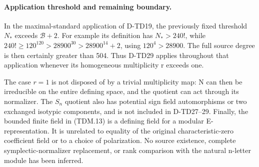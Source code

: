 \paragraph{Application threshold and remaining boundary.}
In the maximal-standard application of D-TD19, the previously fixed
threshold \(N_*\) exceeds \(\mathcal B+2\).  For example its
definition has \(N_*>240!\), while
\(240!\ge120^{120}>28900^{30}>28900^{14}+2\), using
\(120^4>28900\).  The full source degree is then certainly
greater than 504.  Thus D-TD29 applies throughout that application
whenever its homogeneous multiplicity r exceeds one.

The case \(r=1\) is not disposed of by a trivial multiplicity
map: N can then be irreducible on the entire defining space, and
the quotient can act through its normalizer.  The \(S_n\) quotient
also has potential sign field automorphisms or two exchanged
isotypic components, and is not included in D-TD27--29.  Finally,
the bounded finite field in (TDM.13) is a defining field for a
modular E-representation.  It is unrelated to equality of the
original characteristic-zero coefficient field or to a choice of
polarization.  No source existence, complete symplectic-normalizer
replacement, or rank comparison with the natural n-letter module
has been inferred.
